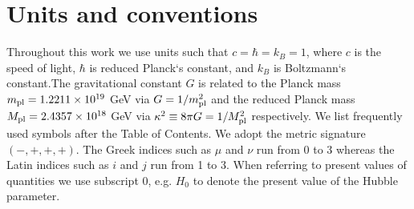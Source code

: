 \section*{Units and conventions}

Throughout this work we use units such that $c=\hbar=k_B=1$, where $c$ is the speed of light, $\hbar$ is reduced Planck`s constant, and $k_B$ is Boltzmann`s constant.The gravitational constant $G$ is related to the Planck mass $m_{\text{\scriptsize pl}}=1.2211\times10^{19}$ GeV via $G=1/m_{\text{\scriptsize pl}}^2$ and the reduced Planck mass $M_{\text{\scriptsize pl}} = 2.4357\times10^{18}$ GeV via $\kappa^2\equiv8\pi G=1/M_{\text{\scriptsize pl}}^2$ respectively. We list frequently used symbols after the Table of Contents. We adopt the metric signature $(-, +, +, +)$. The Greek indices such as $\mu$ and $\nu$ run from 0 to 3 whereas the Latin indices such as $i$ and $j$ run from 1 to 3. When referring to present values of quantities we use subscript $0$, e.g. $H_0$ to denote the present value of the Hubble parameter.
